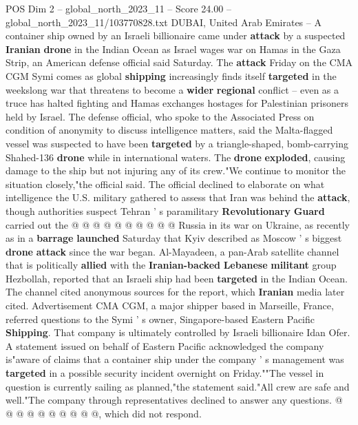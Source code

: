 \begin{textsample}{POS Dim 2 – global\_north\_2023\_11 – Score 24.00 – global\_north\_2023\_11/103770828.txt}  \label{ex:f2_pos_303}
DUBAI, United Arab Emirates -- A container ship owned by an Israeli billionaire came under \textbf{attack} by a suspected \textbf{Iranian} \textbf{drone} in the Indian Ocean as Israel wages war on Hamas in the Gaza Strip, an American defense official said Saturday.
The \textbf{attack} Friday on the CMA CGM Symi comes as global \textbf{shipping} increasingly finds itself \textbf{targeted} in the weekslong war that threatens to become a \textbf{wider} \textbf{regional} conflict -- even as a truce has halted fighting and Hamas exchanges hostages for Palestinian prisoners held by Israel.
The defense official, who spoke to the Associated Press on condition of anonymity to discuss intelligence matters, said the Malta-flagged vessel was suspected to have been \textbf{targeted} by a triangle-shaped, bomb-carrying Shahed-136 \textbf{drone} while in international waters.
The \textbf{drone} \textbf{exploded}, causing damage to the ship but not injuring any of its crew."We continue to monitor the situation closely,"the official said.
The official declined to elaborate on what intelligence the U.S. military gathered to assess that Iran was behind the \textbf{attack}, though authorities suspect Tehran ' s paramilitary \textbf{Revolutionary} \textbf{Guard} carried out the @ @ @ @ @ @ @ @ @ @ Russia in its war on Ukraine, as recently as in a \textbf{barrage} \textbf{launched} Saturday that Kyiv described as Moscow ' s biggest \textbf{drone} \textbf{attack} since the war began.
Al-Mayadeen, a pan-Arab satellite channel that is politically \textbf{allied} with the \textbf{Iranian-backed} \textbf{Lebanese} \textbf{militant} group Hezbollah, reported that an Israeli ship had been \textbf{targeted} in the Indian Ocean.
The channel cited anonymous sources for the report, which \textbf{Iranian} media later cited.
Advertisement CMA CGM, a major shipper based in Marseille, France, referred questions to the Symi ' s owner, Singapore-based Eastern Pacific \textbf{Shipping}.
That company is ultimately controlled by Israeli billionaire Idan Ofer.
A statement issued on behalf of Eastern Pacific acknowledged the company is"aware of claims that a container ship under the company ' s management was \textbf{targeted} in a possible security incident overnight on Friday.""The vessel in question is currently sailing as planned,"the statement said."All crew are safe and well."The company through representatives declined to answer any questions. @ @ @ @ @ @ @ @ @ @, which did not respond.

\end{textsample}
